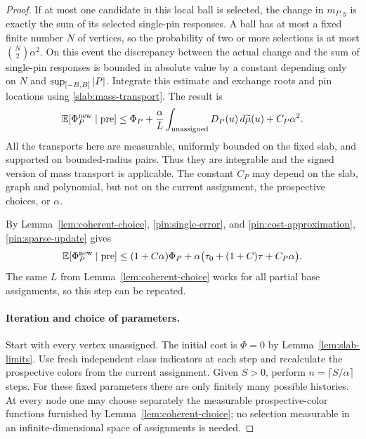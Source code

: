 \begin{proof}
If at most one candidate in this local ball is selected, the change in
$m_{P,y}$ is exactly the sum of its selected single-pin responses.  A
ball has at most a fixed finite number $N$ of vertices, so the
probability of two or more selections is at most
$\binom{N}{2}\alpha^2$.  On this event the discrepancy between the
actual change and the sum of single-pin responses is bounded in
absolute value by a constant depending only on $N$ and
$\sup_{[-B,B]}\left|P\right|$.  Integrate this estimate and exchange roots
and pin locations using \eqref{slab:mass-transport}.  The result is
\begin{equation}\label{pin:sparse-update}
 \mathbb E[\Phi_P^{\mathrm{new}}\mid\mathrm{pre}]
 \leq\Phi_P+
   \frac\alpha L\int_{\mathrm{unassigned}}D_P(u)\,
                  d\widetilde\mu(u)+C_P\alpha^2.
\end{equation}
All the transports here are measurable, uniformly bounded on the
fixed slab, and supported on bounded-radius pairs.  Thus they are
integrable and the signed version of mass transport is applicable.
The constant $C_P$ may depend on the slab, graph and polynomial, but
not on the current assignment, the prospective choices, or $\alpha$.

By Lemma~\ref{lem:coherent-choice},
\eqref{pin:single-error}, and \eqref{pin:cost-approximation},
\eqref{pin:sparse-update} gives
\begin{equation}\label{pin:recurrence}
 \mathbb E[\Phi_P^{\mathrm{new}}\mid\mathrm{pre}]
 \leq(1+C\alpha)\Phi_P+
       \alpha\bigl(\tau_0+(1+C)\tau+C_P\alpha\bigr).
\end{equation}
The same $L$ from Lemma~\ref{lem:coherent-choice} works for all partial
base assignments, so this step can be repeated.

\paragraph{Iteration and choice of parameters.}
Start with every vertex unassigned.  The initial cost is $\Phi=0$ by
Lemma~\ref{lem:slab-limits}.  Use fresh independent class indicators at
each step and recalculate the prospective colors from the current
assignment.  Given $S>0$, perform $n=\lceil S/\alpha\rceil$ steps.
For these fixed parameters there are only finitely many possible
histories.  At every node one may choose separately the measurable
prospective-color functions furnished by
Lemma~\ref{lem:coherent-choice}; no selection measurable in an
infinite-dimensional space of assignments is needed.


\end{proof}
